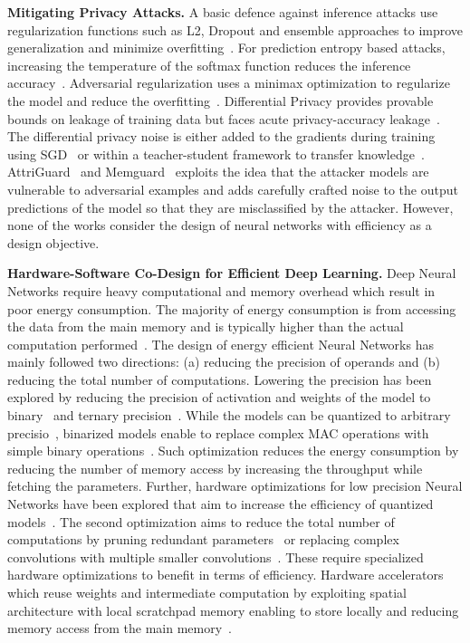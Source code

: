 \noindent\textbf{Mitigating Privacy Attacks.} A basic defence against inference attacks use regularization functions such as L2, Dropout and ensemble approaches to improve generalization and minimize overfitting~\cite{salem2018ml,shokri2017membership}.
For prediction entropy based attacks, increasing the temperature of the softmax function reduces the inference accuracy~\cite{shokri2017membership}.
Adversarial regularization uses a minimax optimization to regularize the model and reduce the overfitting~\cite{DBLP:conf/ccs/NasrSH18}.
Differential Privacy provides provable bounds on leakage of training data but faces acute privacy-accuracy leakage~\cite{236254}.
The differential privacy noise is either added to the gradients during training using SGD~\cite{Abadi:2016:DLD:2976749.2978318} or within a teacher-student framework to transfer knowledge~\cite{papernot2016semi}.
AttriGuard~\cite{217523} and Memguard~\cite{10.1145/3319535.3363201} exploits the idea that the attacker models are vulnerable to adversarial examples and adds carefully crafted noise to the output predictions of the model so that they are misclassified by the attacker.
However, none of the works consider the design of neural networks with efficiency as a design objective.

\noindent\textbf{Hardware-Software Co-Design for Efficient Deep Learning.} Deep Neural Networks require heavy computational and memory overhead which result in poor energy consumption.
The majority of energy consumption is from accessing the data from the main memory and is typically higher than the actual computation performed~\cite{6757323}.
The design of energy efficient Neural Networks has mainly followed two directions: (a) reducing the precision of operands and (b) reducing the total number of computations.
Lowering the precision has been explored by reducing the precision of activation and weights of the model to binary~\cite{NIPS2015_5647, NIPS2016_6573} and ternary precision~\cite{Li2016TernaryWN,DBLP:journals/corr/ZhuHMD16}.
While the models can be quantized to arbitrary precisio~\cite{Hubara:2017:QNN:3122009.3242044}, binarized models enable to replace complex MAC operations with simple binary operations~\cite{rastegari2016xnornet,DBLP:journals/corr/ZhouNZWWZ16}.
Such optimization reduces the energy consumption by reducing the number of memory access by increasing the throughput while fetching the parameters.
Further, hardware optimizations for low precision Neural Networks have been explored that aim to increase the efficiency of quantized models~\cite{AndCav2016YodaNN,Umuroglu2017FINNAF}.
The second optimization aims to reduce the total number of computations by pruning redundant parameters~\cite{Han:2015:LBW:2969239.2969366} or replacing complex convolutions with multiple smaller convolutions~\cite{DBLP:journals/corr/IandolaMAHDK16}.
These require specialized hardware optimizations to benefit in terms of efficiency.
Hardware accelerators which reuse weights and intermediate computation by exploiting spatial architecture with local scratchpad memory enabling to store locally and reducing memory access from the main memory~\cite{7551407,10.1109/ISCA.2016.30}.


